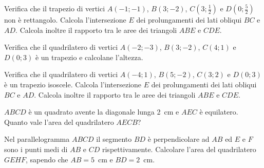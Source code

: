 \begin{multicols}{2}
\begin{esercizio}
\label{ese:7.96}
Verifica che il trapezio di vertici $A(-1;-1)$, $B(3;-2)$, 
$C\left(3;\frac{1}{2}\right)$ e $D\left(0;\frac{5}{2}\right)$ non è 
rettangolo. Calcola l'intersezione $E$ dei prolungamenti dei lati 
obliqui $BC$ e $AD$. Calcola inoltre il rapporto tra le aree dei 
triangoli $ABE$ e $CDE$.
\end{esercizio}

\begin{esercizio}
\label{ese:7.97}
Verifica che il quadrilatero di vertici $A(-2;-3)$, $B(3;-2)$, 
$C(4;1)$ e $D(0;3)$ è un trapezio e calcolane l'altezza.
\end{esercizio}

\begin{esercizio}
\label{ese:7.98}
Verifica che il quadrilatero di vertici $A(-4;1)$, $B(5;-2)$, 
$C(3;2)$ e $D(0;3)$ è un trapezio isoscele. Calcola l'intersezione $E$ 
dei prolungamenti dei lati obliqui $BC$ e $AD$. Calcola inoltre il 
rapporto tra le aree dei triangoli $ABE$ e $CDE$.
\end{esercizio}

\begin{esercizio}
\label{ese:7.104}
$ABCD$ è un quadrato avente la diagonale lunga 2~cm e $AEC$ è 
equilatero. Quanto vale l'area del quadrilatero $AECB$?
\end{esercizio}

%
%


\begin{esercizio}
\label{ese:7.109}
Nel parallelogramma $ABCD$ il segmento $BD$ è perpendicolare ad $AB$ 
ed $E$ e $F$ sono i punti medi di $AB$ e $CD$ rispettivamente. 
Calcolare l'area del quadrilatero $GEHF$, sapendo che $AB=5$~cm e 
$BD=2$~cm.
\end{esercizio}


\end{multicols}
